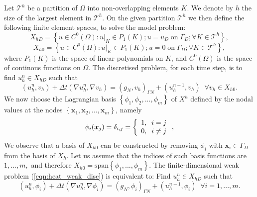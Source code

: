 Let $\mathcal{T}^{h}$ be a partition of $\Omega$ into non-overlapping elements $K$. We denote by $h$ the size of the largest element in $\mathcal{T}^{h}$. On the given partition $\mathcal{T}^{h}$  we then define the following finite element spaces, to solve the model problem:
%
\begin{equation*}
X_{hD}=\left\lbrace u  \in C^{0}(\Omega) : u |_{K} \in P_{1}(K); u  = u_{D} \;\mbox{on} \;\Gamma_{D} ; \forall K \in \mathcal{T}^{h} \right\rbrace,
\label{eqn:fespace_modelD}
\end{equation*}
\begin{equation*}
X_{h0}=\left\lbrace u  \in C^{0}(\Omega) : u |_{K} \in P_{1}(K); u  = 0 \;\mbox{on} \;\Gamma_{D} ; \forall K \in \mathcal{T}^{h} \right\rbrace,
\label{eqn:fespace_model0}
\end{equation*}
where  $P_{1}(K)$ is the space of linear polynomials on $K$, and $C^{0}(\Omega)$ is the space of continous functions on $\Omega$. The discretised problem, for each time step, is to find $u^{n}_{h}\in X_{hD}$ such that 
\begin{equation}
\left( u^{n}_{h},v_{h} \right) + \Delta t \left(\nabla u_{h}^{n},\nabla v_{h} \right)=\left(g_{N} ,v_{h} \right)_{\Gamma N}+\left( u^{n-1}_{h},v_{h} \right) \;\;\forall v_{h} \in X_{h0}.
\label{eqn:heat_weak_disc}
\end{equation}
We now choose the Lagrangian basis $\left\lbrace \phi_{1},\phi_{2},...,\phi_{m} \right\rbrace$ of $X^{h}$ defined by the nodal values at the nodes $\left\lbrace \mathbf{x}_{1},\mathbf{x}_{2},...,\mathbf{x}_{m} \right\rbrace$, namely
%
\begin{equation*}
\phi_{i}(\mathbf{x}_{j}) =\delta_{i,j}= \left\lbrace
  \begin{array}{l l}
    1,\;\;i=j\\    
    0,\;\;i \neq j
  \end{array} \right. ,
\end{equation*}
%
%
We observe that a basis of $X_{h0}$ can be constructed by removing $\phi_{i}$ with $\mathbf{x}_{i}\in \Gamma_{D}$ from the basis of $X_{h}$. Let us assume that the indices of such basis functions are
$1,...,m,$ and therefore $X_{h0} = \mbox{span}\left\lbrace \phi_{1},...,\phi_{m} \right\rbrace$. The finite-dimensional weak
problem (\ref{eqn:heat_weak_disc}) is equivalent to: Find $u^{n}_{h}\in X_{hD}$ such that 
\begin{equation}
\left( u^{n}_{h},\phi_{i} \right) + \Delta t \left(\nabla u^{n}_{h},\nabla \phi_{i} \right)=\left(g_{N} ,\phi_{i} \right)_{\Gamma N}+\left( u^{n-1}_{h},\phi_{i} \right) \;\;\forall i=1,...,m.
\label{eqn:heat_weak_basis}
\end{equation}
